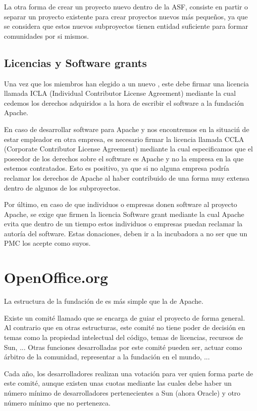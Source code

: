 La otra forma de crear un proyecto nuevo dentro de la ASF, consiste en partir o separar un proyecto existente para crear proyectos nuevos m\'as pequeños, ya que se considera que estos nuevos subproyectos tienen entidad suficiente para formar comunidades por si mismos.

\subsection{Licencias y Software grants}
Una vez que los miembros han elegido a un nuevo , este debe firmar una licencia llamada ICLA (Individual Contributor License Agreement) mediante la cual cedemos los derechos adquiridos a la hora de escribir el software a la fundaci\'on Apache.

En caso de desarrollar software para Apache y nos encontremos en la situaci\'n de estar empleador en otra empresa, es necesario firmar la licencia llamada CCLA (Corporate Contributor License Agreement) mediante la cual especificamos que el poseedor de los derechos sobre el software es Apache y no la empresa en la que estemos contratados. Esto es positivo, ya que si no alguna empresa podr\'ia reclamar los derechos de Apache al haber contribuido de una forma muy extensa dentro de algunos de los subproyectos.

Por \'ultimo, en caso de que individuos o empresas donen software al proyecto Apache, se exige que firmen la licencia Software grant mediante la cual Apache evita que dentro de un tiempo estos individuos o empresas puedan reclamar la autor\'ia del software. Estas donaciones, deben ir a la incubadora a no ser que un PMC los acepte como suyos.

\newpage
\section{OpenOffice.org}
La estructura de la fundaci\'on de  es m\'as simple que la de Apache.

Existe un comit\'e llamado  que se encarga de guiar el proyecto de forma general. Al contrario que en otras estructuras, este comit\'e no tiene poder de decisi\'on en temas como la propiedad intelectual del c\'odigo, temas de licencias, recursos de Sun, ... Otras funciones desarrolladas por este comit\'e pueden ser, actuar como \'arbitro de la comunidad, representar a la fundaci\'on en el mundo, ...

Cada año, los desarrolladores realizan una votaci\'on para ver quien forma parte de este comit\'e, aunque existen unas cuotas mediante las cuales debe haber un n\'umero m\'inimo de desarrolladores pertenecientes a Sun (ahora Oracle) y otro n\'umero m\'inimo que no pertenezca.


